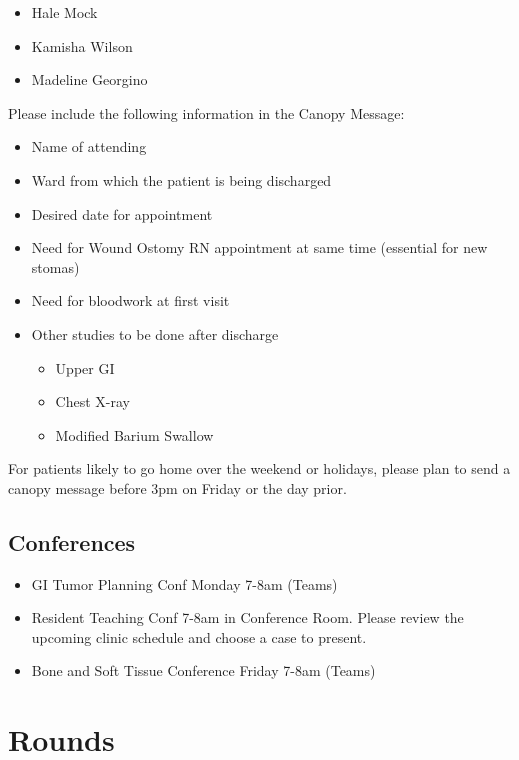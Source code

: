 \documentclass[
]{book}
\providecommand{\tightlist}{%
  \setlength{\itemsep}{0pt}\setlength{\parskip}{0pt}}
\begin{document}
\begin{itemize}
\tightlist
\item
  Hale Mock
\item
  Kamisha Wilson
\item
  Madeline Georgino
\end{itemize}

Please include the following information in the Canopy Message:

\begin{itemize}
\tightlist
\item
  Name of attending
\item
  Ward from which the patient is being discharged
\item
  Desired date for appointment
\item
  Need for Wound Ostomy RN appointment at same time (essential for new stomas)
\item
  Need for bloodwork at first visit
\item
  Other studies to be done after discharge

  \begin{itemize}
  \tightlist
  \item
    Upper GI
  \item
    Chest X-ray
  \item
    Modified Barium Swallow
  \end{itemize}
\end{itemize}

For patients likely to go home over the weekend or holidays, please plan to send a canopy message before 3pm on Friday or the day prior.

\hypertarget{conferences-1}{%
\section{Conferences}\label{conferences-1}}

\begin{itemize}
\tightlist
\item
  GI Tumor Planning Conf Monday 7-8am (Teams)
\item
  Resident Teaching Conf 7-8am in Conference Room. Please review the upcoming clinic schedule and choose a case to present.
\item
  Bone and Soft Tissue Conference Friday 7-8am (Teams)
\end{itemize}

\hypertarget{rounds-2}{%
\chapter{Rounds}\label{rounds-2}}
\end{document}
